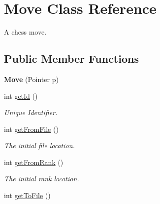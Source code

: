 \hypertarget{classMove}{
\section{Move Class Reference}
\label{classMove}
}


A chess move.  


\subsection*{Public Member Functions}
\begin{DoxyCompactItemize}
\item 
\hypertarget{classMove_a65aad2b2e0a75252e3fb01af7f0abe2f}{
{\bfseries Move} (Pointer p)}
\label{classMove_a65aad2b2e0a75252e3fb01af7f0abe2f}

\item 
\hypertarget{classMove_a57933b3f457c700ca46b4e74eacf805b}{
int \hyperlink{classMove_a57933b3f457c700ca46b4e74eacf805b}{getId} ()}
\label{classMove_a57933b3f457c700ca46b4e74eacf805b}

\begin{DoxyCompactList}\small\item\em Unique Identifier. \item\end{DoxyCompactList}\item 
\hypertarget{classMove_ac7817e75fd4570fe700b41c015872a8a}{
int \hyperlink{classMove_ac7817e75fd4570fe700b41c015872a8a}{getFromFile} ()}
\label{classMove_ac7817e75fd4570fe700b41c015872a8a}

\begin{DoxyCompactList}\small\item\em The initial file location. \item\end{DoxyCompactList}\item 
\hypertarget{classMove_a5b209dd8581102556625937f3b03a5a2}{
int \hyperlink{classMove_a5b209dd8581102556625937f3b03a5a2}{getFromRank} ()}
\label{classMove_a5b209dd8581102556625937f3b03a5a2}

\begin{DoxyCompactList}\small\item\em The initial rank location. \item\end{DoxyCompactList}\item 
\hypertarget{classMove_a257d0bbe9b5b3ccfea1322cb5a66942a}{
int \hyperlink{classMove_a257d0bbe9b5b3ccfea1322cb5a66942a}{getToFile} ()}
\label{classMove_a257d0bbe9b5b3ccfea1322cb5a66942a}


\end{DoxyCompactItemize}
